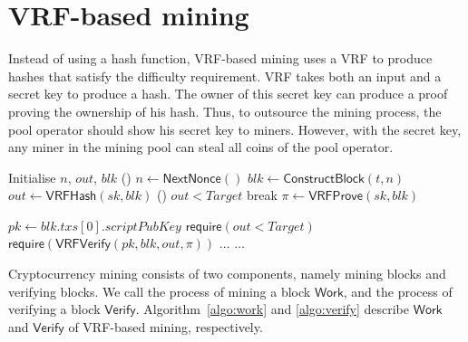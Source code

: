 \section{VRF-based mining}
\label{sec:construction}

Instead of using a hash function, VRF-based mining uses a VRF to produce hashes that satisfy the difficulty requirement.
VRF takes both an input and a secret key to produce a hash.
The owner of this secret key can produce a proof proving the ownership of his hash.
Thus, to outsource the mining process, the pool operator should show his secret key to miners.
However, with the secret key, any miner in the mining pool can steal all coins of the pool operator.

\begin{algorithm}[]
\caption{$\mathsf{Work}(sk, t, Target)$.}
\label{algo:work}
\SetAlgoLined\DontPrintSemicolon
{}
  Initialise $n$, $out$, $blk$ 
  \While () {$n \gets \mathsf{NextNonce}()$}{
    $blk \gets \mathsf{ConstructBlock}(t, n)$ 
    $out \gets \mathsf{VRFHash}(sk, blk)$ 
    \If () {$out < Target$}{
      break 
    }
  }
  $\pi \gets \mathsf{VRFProve}(sk, blk)$ 
   
\end{algorithm}



\begin{algorithm}[h]
\caption{$\mathsf{Verify}(blk, out, \pi, Target)$}
\label{algo:verify}
\SetAlgoLined\DontPrintSemicolon
$pk \gets blk . txs[0] . scriptPubKey$ 
$\mathsf{require}(out < Target)$ 
$\mathsf{require}(\mathsf{VRFVerify}(pk, blk, out, \pi))$ \;
$\dots$ 
$\dots$ 
\end{algorithm}

Cryptocurrency mining consists of two components, namely mining blocks and verifying blocks.
We call the process of mining a block $\mathsf{Work}$, and the process of verifying a block $\mathsf{Verify}$.
Algorithm~\ref{algo:work} and \ref{algo:verify} describe $\mathsf{Work}$ and $\mathsf{Verify}$ of VRF-based mining, respectively.

